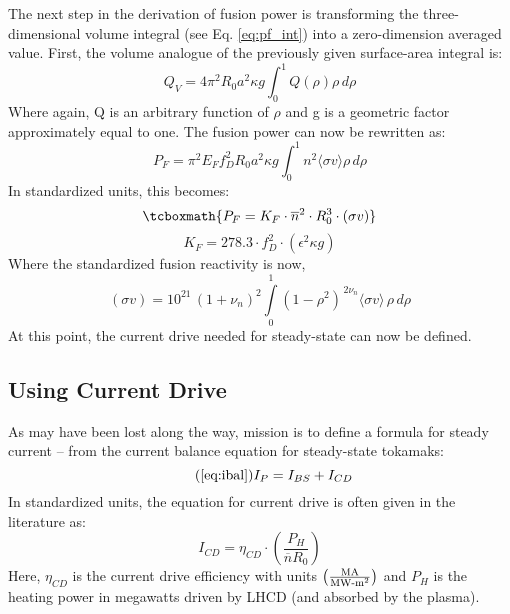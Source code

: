  The next step in the derivation of fusion power is transforming the three-dimensional volume integral (see Eq. \ref{eq:pf_int}) into a zero-dimension averaged value. First, the volume analogue of the previously given surface-area integral is:
 \begin{equation}
  	\label{eq:qv}
 	Q_V = 4 \pi^2 R_0 a^2 \kappa g \int_0^1 Q(\rho) \rho \, d\rho
 \end{equation}
 Where again, Q is an arbitrary function of $\rho$ and g is a geometric factor approximately equal to one. The fusion power can now be rewritten as:
 \begin{equation}
 	P_F = \pi^2 E_F f_D^2 R_0 a^2 \kappa g \int_0^1 n^2 \langle \sigma v \rangle \rho \, d\rho
 \end{equation}
In standardized units, this becomes:
\begin{equation}
	\label{eq:pf}
	\tcboxmath{
	P_F = K_F \cdot \overline{n}^2 \cdot R_0^3  \cdot (\sigma v)
	}
\end{equation}
\begin{equation}
  K_F = 278.3 \cdot f_D^2 \cdot ( \epsilon^2 \kappa g )
\end{equation}
Where the standardized fusion reactivity is now,
\begin{equation}
   (\sigma v) = 10^{21} \, (1+\nu_n)^2 \int\limits_0^1 ( 1 - \rho^2 ) ^ { \, 2 \nu_n} \langle \sigma v \rangle \, \rho \, d\rho
\end{equation}
At this point, the current drive needed for steady-state can now be defined.

\subsection{Using Current Drive}

As may have been lost along the way,  mission is to define a formula for steady current -- from the current balance equation for steady-state tokamaks:
\begin{equation}
		\tag{\ref{eq:ibal}}
		I_P = I_{BS} + I_{CD}
\end{equation}
In standardized units, the equation for current drive is often given in the literature as: \cite{itercd}
\begin{equation}
	I_{CD} = \eta_{CD} \cdot \left( \frac{P_H}{\overline n R_0} \right)
\end{equation}
Here, $\eta_{CD}$ is the current drive efficiency with units $ \left(
\frac{ \textnormal{MA} }{ \textnormal{MW-m}^2 } \right) $ and $P_H$ is the heating power in megawatts driven by LHCD (and absorbed by the plasma).

